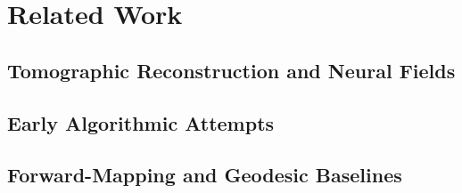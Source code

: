 \chapter{Related Work}
\label{chap:related-work}

\section{Tomographic Reconstruction and Neural Fields}
\label{sec:tomo-neural-fields}

\section{Early Algorithmic Attempts}
\label{sec:early-algorithmic}

\section{Forward-Mapping and Geodesic Baselines}
\label{sec:forward-geodesic}
